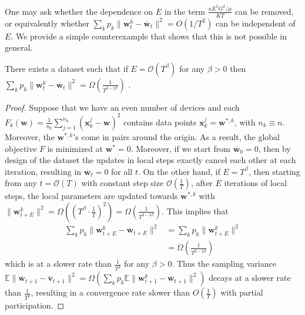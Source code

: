 One may ask whether the dependence on $E$ in the term $\frac{\kappa E^{2}G^{2}/\mu}{KT}$
can be removed, or equivalently whether $\sum_{k}p_{k}\|\mathbf{w}_{t}^{k}-\overline{\mathbf{w}}_{t}\|^{2}=O(1/T^{2})$
can be independent of $E$. We provide a simple counterexample that
shows that this is not possible in general. 
\begin{lemma}
	There exists a dataset such that if $E=\mathcal{O}(T^{\beta})$ for
	any $\beta>0$ then $\sum_{k}p_{k}\|\mathbf{w}_{t}^{k}-\overline{\mathbf{w}}_{t}\|^{2}=\Omega(\frac{1}{T^{2-2\beta}})$
	.
\end{lemma}
\begin{proof}
	Suppose that we have an even number of devices and each $F_{k}(\mathbf{w})=\frac{1}{n_{k}}\sum_{j=1}^{n_{k}}(\mathbf{x}_{k}^{j}-\mathbf{w})^{2}$
	contains data points $\mathbf{x}_{k}^{j}=\mathbf{w}^{\ast,k}$, with
	$n_{k}\equiv n$. Moreover, the $\mathbf{w}{}^{\ast,k}$'s come in
	pairs around the origin. As a result, the global objective $F$ is
	minimized at $\mathbf{w}^{\ast}=0$. Moreover, if we start from $\overline{\mathbf{w}}_{0}=0$,
	then by design of the dataset the updates in local steps exactly cancel
	each other at each iteration, resulting in $\overline{\mathbf{w}}_{t}=0$
	for all $t$. On the other hand, if $E=T^{\beta}$, then starting
	from any $t=\mathcal{O}(T)$ with constant step size $\mathcal{O}(\frac{1}{T})$,
	after $E$ iterations of local steps, the local parameters are updated
	towards $\mathbf{w}^{\ast,k}$ with $\|\mathbf{w}_{t+E}^{k}\|^{2}=\Omega((T^{\beta}\cdot\frac{1}{T})^{2})=\Omega(\frac{1}{T^{2-2\beta}})$.
	This implies that 
	\begin{align*}
	\sum_{k}p_{k}\|\mathbf{w}_{t+E}^{k}-\overline{\mathbf{w}}_{t+E}\|^{2} & =\sum_{k}p_{k}\|\mathbf{w}_{t+E}^{k}\|^{2}\\
	& =\Omega(\frac{1}{T^{2-2\beta}})
	\end{align*}
	which is at a slower rate than $\frac{1}{T^{2}}$ for any $\beta>0$.
	Thus the sampling variance $\mathbb{E}\|\overline{\mathbf{w}}_{t+1}-\overline{\mathbf{v}}_{t+1}\|^{2}=\Omega(\sum_{k}p_{k}\mathbb{E}\|\mathbf{w}_{t+1}^{k}-\overline{\mathbf{w}}_{t+1}\|^{2})$
	decays at a slower rate than $\frac{1}{T^{2}}$, resulting in a convergence
	rate slower than $O(\frac{1}{T})$ with partial participation. 
\end{proof}